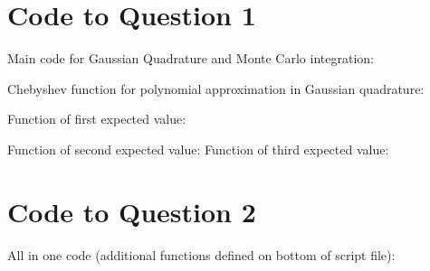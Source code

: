 \documentclass{article}
\begin{document}
	\begin{appendices}
		\section{Code to Question 1}
			Main code for Gaussian Quadrature and Monte Carlo integration:

Chebyshev function for polynomial approximation in Gaussian quadrature:

Function of first expected value:

Function of second expected value:
Function of third expected value:
		\section{Code to Question 2}
		All in one code (additional functions defined on bottom of script file):
		
	\end{appendices}
\end{document}

